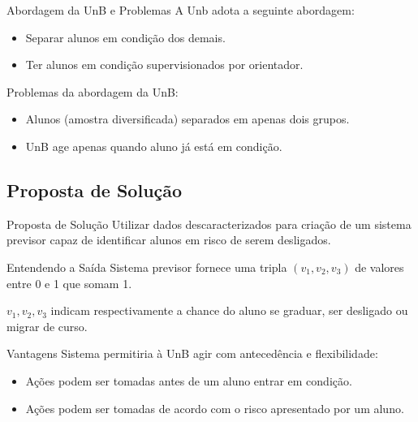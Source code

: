 \begin{frame}{Abordagem da UnB e Problemas}
    A Unb adota a seguinte abordagem: 
    \begin{itemize}
        \item Separar alunos em condição dos demais.
        \item Ter alunos em condição supervisionados por orientador. 
    \end{itemize}

    \vspace{0.5cm}

    Problemas da abordagem da UnB: 
    \begin{itemize}
        \item Alunos (amostra diversificada) separados em apenas dois grupos.
        \item UnB age apenas quando aluno já está em condição.
    \end{itemize}
\end{frame}

\subsection{Proposta de Solução}
\begin{frame}{Proposta de Solução}
    Utilizar dados descaracterizados para criação de um sistema previsor capaz de 
    identificar alunos em risco de serem desligados. 
\end{frame}

\begin{frame}{Entendendo a Saída}
    Sistema previsor fornece uma tripla $(v_1, v_2, v_3)$ de valores entre 0 e 1 que
    somam 1. 

    \vspace{0.5cm}

    $v_1, v_2, v_3$ indicam respectivamente a chance do aluno se graduar, ser
    desligado ou migrar de curso. 
\end{frame}

\begin{frame}{Vantagens}
    Sistema permitiria à UnB agir com antecedência e flexibilidade: 
    \begin{itemize}
        \item Ações podem ser tomadas antes de um aluno entrar em condição. 
        \item Ações podem ser tomadas de acordo com o risco apresentado por um aluno.
    \end{itemize}
\end{frame}

